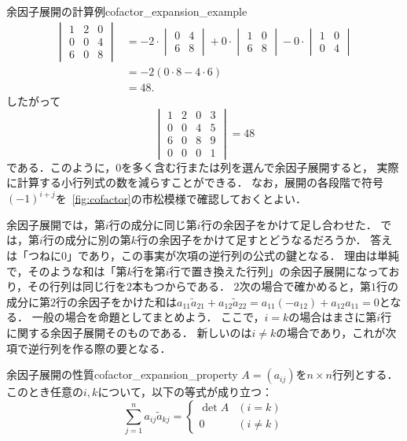 \begin{example}{余因子展開の計算例}{cofactor_expansion_example}
\begin{align*}
\begin{vmatrix}
    1 & 2 & 0 \\
    0 & 0 & 4 \\
    6 & 0 & 8
  \end{vmatrix}
  &=
  -2 \cdot
  \begin{vmatrix}
    0 & 4 \\
    6 & 8
  \end{vmatrix}
  +0 \cdot
  \begin{vmatrix}
    1 & 0 \\
    6 & 8
  \end{vmatrix}
  -0 \cdot
  \begin{vmatrix}
    1 & 0 \\
    0 & 4
  \end{vmatrix} \\
  &=
  -2(0 \cdot 8 - 4 \cdot 6) \\
  &= 48.
  \end{align*}
  したがって
  \[
  \begin{vmatrix}
    1 & 2 & 0 & 3 \\
    0 & 0 & 4 & 5 \\
    6 & 0 & 8 & 9 \\
    0 & 0 & 0 & 1
  \end{vmatrix}
  =48
  \]
  である．このように，$0$を多く含む行または列を選んで余因子展開すると，
  実際に計算する小行列式の数を減らすことができる．
  なお，展開の各段階で符号$(-1)^{i+j}$を\figurename~\ref{fig:cofactor}の市松模様で確認しておくとよい．
\end{example}

余因子展開では，第$i$行の成分に同じ第$i$行の余因子をかけて足し合わせた．
では，第$i$行の成分に別の第$k$行の余因子をかけて足すとどうなるだろうか．
答えは「つねに$0$」であり，この事実が次項の逆行列の公式の鍵となる．
理由は単純で，そのような和は「第$k$行を第$i$行で置き換えた行列」の余因子展開になっており，その行列は同じ行を$2$本もつからである．
$2$次の場合で確かめると，第$1$行の成分に第$2$行の余因子をかけた和は$a_{11}\tilde{a}_{21} + a_{12}\tilde{a}_{22} = a_{11}(-a_{12}) + a_{12}a_{11} = 0$となる．
一般の場合を命題としてまとめよう．
ここで，$i = k$の場合はまさに第$i$行に関する余因子展開そのものである．
新しいのは$i \ne k$の場合であり，これが次項で逆行列を作る際の要となる．

\begin{prop}{余因子展開の性質}{cofactor_expansion_property}
  $A = (a_{ij})$を$n \times n$行列とする．このとき任意の$i,k$について，以下の等式が成り立つ：
  \[
  \sum_{j=1}^{n} a_{ij} \tilde{a}_{kj} = \begin{cases} \det A & (i=k) \\ 0 & (i \ne k) \end{cases}
  \]
\end{prop}

